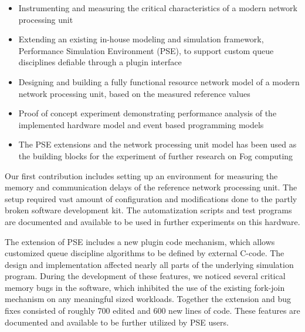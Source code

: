 \begin{itemize}
\item Instrumenting and measuring the critical characteristics of a modern network processing unit

\item Extending an existing in-house modeling and simulation framework, Performance Simulation Environment (PSE), to support custom queue disciplines defiable through a plugin interface %


\item Designing and building a fully functional resource network model of a modern network processing unit, based on the measured reference values


\item Proof of concept experiment demonstrating performance analysis of the implemented hardware model and event based programming models

\item The PSE extensions and the network processing unit model has been used as the building blocks for the experiment of further research on Fog computing
\end{itemize}


Our first contribution includes setting up an environment for measuring the memory and communication delays of the reference network processing unit. The setup required vast amount of configuration and modifications done to the partly broken software development kit. The automatization scripts and test programs are documented and available to be used in further experiments on this hardware.

The extension of PSE includes a new plugin code mechanism, which allows customized queue discipline algorithms to be defined by external C-code. The design and implementation affected nearly all parts of the underlying simulation program. During the development of these features, we noticed several critical memory bugs in the software, which inhibited the use of the existing fork-join mechanism on any meaningful sized workloads. Together the extension and bug fixes consisted of roughly 700 edited and 600 new lines of code. These features are documented and available to be further utilized by PSE users.


